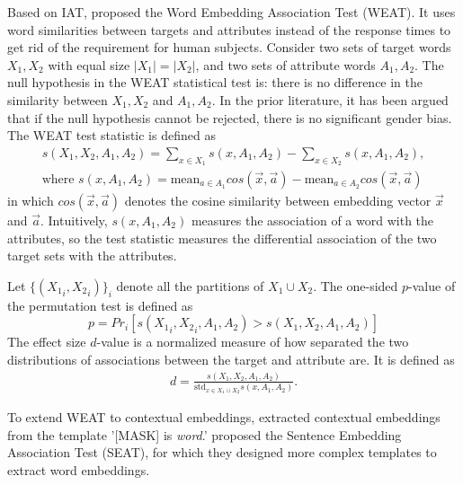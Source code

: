 Based on IAT,  proposed the
Word Embedding Association Test (WEAT). It uses word
similarities between targets and attributes instead of the
response times to get rid of the requirement for human
subjects. Consider two sets of target words $X_1,X_2$ with
equal size $|X_1|=|X_2|$, and two sets of attribute words
$A_1,A_2$. The null hypothesis in the WEAT statistical test
is: there is no difference in the similarity between
$X_1,X_2$ and $A_1,A_2$. In the prior literature, it has
been argued that if the null hypothesis cannot be rejected,
there is no significant gender bias.  The WEAT test
statistic is defined as
\begin{gather*}
s(X_1,X_2,A_1,A_2)=\sum_{x\in X_1}s(x,A_1,A_2)-\sum_{x\in X_2}s(x,A_1,A_2),\\
\mbox{where } s(x,A_1,A_2)=\mbox{mean}_{a\in A_1}cos(\vec{x},\vec{a})-\mbox{mean}_{a\in A_2}cos(\vec{x},\vec{a})
\end{gather*}
in which $cos(\vec{x},\vec{a})$ denotes the cosine similarity between embedding vector $\vec{x}$ and $\vec{a}$. Intuitively, $s(x,A_1,A_2)$ measures the association of a word with the attributes, so the test statistic measures the differential association of the two target sets with the attributes. 

Let $\{({X_1}_i,{X_2}_i)\}_{i}$ denote all the partitions of $X_1\cup X_2$. The one-sided $p$-value of the permutation test is defined as $$p=Pr_i[s({X_1}_i,{X_2}_i,A_1,A_2)>s(X_1,X_2,A_1,A_2)]$$
The effect size $d$-value is a normalized measure of how separated the two distributions of associations between the target and attribute are. It is defined as
\begin{eqnarray}
d=\frac{s(X_1,X_2,A_1,A_2)}{\mbox{std}_{x\in X_1 \cup X_2}s(x,A_1,A_2)}.\nonumber
\end{eqnarray}

To extend WEAT to contextual embeddings,
 extracted contextual embeddings
from the template '[MASK] is \textit{word}.'
 proposed the Sentence Embedding
Association Test (SEAT), for which they designed more complex templates to extract word embeddings. 

